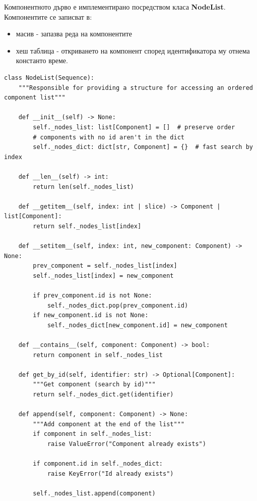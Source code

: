         Компонентното дърво е имплементирано посредством класа 
        \textbf{NodeList}. Компонентите се записват в:
        \begin{itemize}
                \item масив - запазва реда на компонентите
                \item хеш таблица - откриването на компонент според
                        идентификатора му отнема константо време.
        \end{itemize}

        \hspace{1mm}
        \begin{lstlisting}[style=py]
class NodeList(Sequence):
    """Responsible for providing a structure for accessing an ordered component list"""

    def __init__(self) -> None:
        self._nodes_list: list[Component] = []  # preserve order
        # components with no id aren't in the dict
        self._nodes_dict: dict[str, Component] = {}  # fast search by index

    def __len__(self) -> int:
        return len(self._nodes_list)

    def __getitem__(self, index: int | slice) -> Component | list[Component]:
        return self._nodes_list[index]

    def __setitem__(self, index: int, new_component: Component) -> None:
        prev_component = self._nodes_list[index]
        self._nodes_list[index] = new_component

        if prev_component.id is not None:
            self._nodes_dict.pop(prev_component.id)
        if new_component.id is not None:
            self._nodes_dict[new_component.id] = new_component

    def __contains__(self, component: Component) -> bool:
        return component in self._nodes_list

    def get_by_id(self, identifier: str) -> Optional[Component]:
        """Get component (search by id)"""
        return self._nodes_dict.get(identifier)

    def append(self, component: Component) -> None:
        """Add component at the end of the list"""
        if component in self._nodes_list:
            raise ValueError("Component already exists")

        if component.id in self._nodes_dict:
            raise KeyError("Id already exists")

        self._nodes_list.append(component)


\end{lstlisting}
